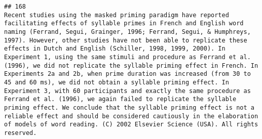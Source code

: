 \documentclass[
  english,
  man]{apa6}
\begin{document}
\begin{verbatim}
## 168                                                                                                                                                                                                                                                                                                                                                                                                                                                                                                                                                                                                                                                                                                                                                                                                                                                                                                                                                                                                                                                                                                                                                                                                                                                                                                                                                                                                                                                                                                                                                                                                                                                                             Recent studies using the masked priming paradigm have reported facilitating effects of syllable primes in French and English word naming (Ferrand, Segui, Grainger, 1996; Ferrand, Segui, & Humphreys, 1997). However, other studies have not been able to replicate these effects in Dutch and English (Schiller, 1998, 1999, 2000). In Experiment 1, using the same stimuli and procedure as Ferrand et al. (1996), we did not replicate the syllable priming effect in French. In Experiments 2a and 2b, when prime duration was increased (from 30 to 45 and 60 ms), we did not obtain a syllable priming effect. In Experiment 3, with 60 participants and exactly the same procedure as Ferrand et al. (1996), we again failed to replicate the syllable priming effect. We conclude that the syllable priming effect is not a reliable effect and should be considered cautiously in the elaboration of models of word reading. (C) 2002 Elsevier Science (USA). All rights reserved.

\end{verbatim}
\end{document}

